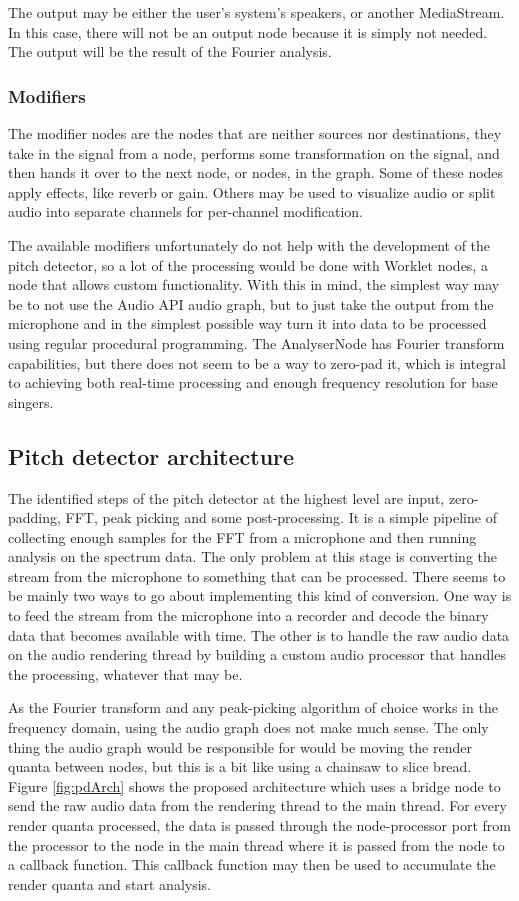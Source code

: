 The output may be either the user's system's speakers, or another MediaStream. In this case, there will not be an output node because it is simply not needed. The output will be the result of the Fourier analysis.

\subsubsection{Modifiers} 
The modifier nodes are the nodes that are neither sources nor destinations, they take in the signal from a node, performs some transformation on the signal, and then hands it over to the next node, or nodes, in the graph. Some of these nodes apply effects, like reverb or gain. Others may be used to visualize audio or split audio into separate channels for per-channel modification.

The available modifiers unfortunately do not help with the development of the pitch detector, so a lot of the processing would be done with Worklet nodes, a node that allows custom functionality. With this in mind, the simplest way may be to not use the Audio API audio graph, but to just take the output from the microphone and in the simplest possible way turn it into data to be processed using regular procedural programming. The AnalyserNode has Fourier transform capabilities, but there does not seem to be a way to zero-pad it, which is integral to achieving both real-time processing and enough frequency resolution for base singers. 

\subsection{Pitch detector architecture}
The identified steps of the pitch detector at the highest level are input, zero-padding, FFT, peak picking and some post-processing. It is a simple pipeline of collecting enough samples for the FFT from a microphone and then running analysis on the spectrum data. The only problem at this stage is converting the stream from the microphone to something that can be processed. There seems to be mainly two ways to go about implementing this kind of conversion. One way is to feed the stream from the microphone into a recorder and decode the binary data that becomes available with time. The other is to handle the raw audio data on the audio rendering thread by building a custom audio processor that handles the processing, whatever that may be. 

As the Fourier transform and any peak-picking algorithm of choice works in the frequency domain, using the audio graph does not make much sense. The only thing the audio graph would be responsible for would be moving the render quanta between nodes, but this is a bit like using a chainsaw to slice bread. Figure \ref{fig:pdArch} shows the proposed architecture which uses a bridge node to send the raw audio data from the rendering thread to the main thread. For every render quanta processed, the data is passed through the node-processor port from the processor to the node in the main thread where it is passed from the node to a callback function. This callback function may then be used to accumulate the render quanta and start analysis.

